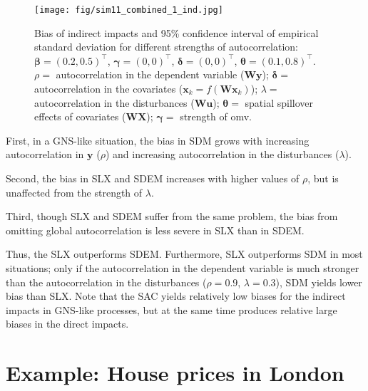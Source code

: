 \documentclass[
  letterpaper,
  DIV=11,
  numbers=noendperiod]{scrreprt}
\begin{document}
\begin{figure}

{\centering \texttt{[image: fig/sim11\_combined\_1\_ind.jpg]}

}

\caption{Bias of indirect impacts and 95\% confidence interval of
empirical standard deviation for different strengths of autocorrelation:
\({\boldsymbol{\mathbf{\beta}}}=(0.2, 0.5)^\intercal\),
\({\boldsymbol{\mathbf{\gamma}}}=(0, 0)^\intercal\),
\({\boldsymbol{\mathbf{\delta}}}=(0, 0)^\intercal\),
\({\boldsymbol{\mathbf{\theta}}}=(0.1, 0.8)^\intercal\). \(\rho=\)
autocorrelation in the dependent variable
(\(\boldsymbol{\mathbf{W}} \boldsymbol{\mathbf{y}}\));
\(\boldsymbol{\mathbf{\delta}}=\) autocorrelation in the covariates
(\(\boldsymbol{\mathbf{x}}_k = f(\boldsymbol{\mathbf{W}} \boldsymbol{\mathbf{x}}_k)\));
\(\lambda=\) autocorrelation in the disturbances
(\(\boldsymbol{\mathbf{W}} \boldsymbol{\mathbf{u}}\));
\(\boldsymbol{\mathbf{\theta}}=\) spatial spillover effects of
covariates (\(\boldsymbol{\mathbf{W}} \boldsymbol{\mathbf{X}}\));
\(\boldsymbol{\mathbf{\gamma}}=\) strength of omv.}

\end{figure}

First, in a GNS-like situation, the bias in SDM grows with increasing
autocorrelation in \({\boldsymbol{\mathbf{y}}}\) (\(\rho\)) and
increasing autocorrelation in the disturbances (\(\lambda\)).

Second, the bias in SLX and SDEM increases with higher values of
\(\rho\), but is unaffected from the strength of \(\lambda\).

Third, though SLX and SDEM suffer from the same problem, the bias from
omitting global autocorrelation is less severe in SLX than in SDEM.

Thus, the SLX outperforms SDEM. Furthermore, SLX outperforms SDM in most
situations; only if the autocorrelation in the dependent variable is
much stronger than the autocorrelation in the disturbances
(\(\rho=0.9\), \(\lambda=0.3\)), SDM yields lower bias than SLX. Note
that the SAC yields relatively low biases for the indirect impacts in
GNS-like processes, but at the same time produces relative large biases
in the direct impacts.

\hypertarget{example-house-prices-in-london}{%
\section{Example: House prices in
London}\label{example-house-prices-in-london}}
\end{document}
